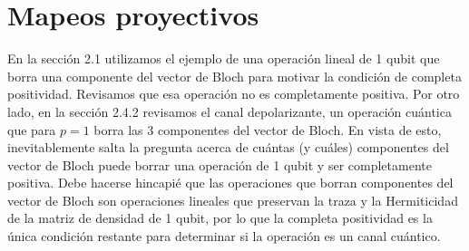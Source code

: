 \chapter{Mapeos proyectivos}  
% 

En la sección 2.1 utilizamos el
ejemplo de una operación lineal 
de 1 qubit que borra una componente del vector de Bloch para motivar
la condición de completa positividad. 
Revisamos que esa operación no es completamente positiva.
Por otro lado, en la sección 2.4.2 revisamos el 
canal depolarizante, un operación cuántica que para $p=1$
borra las 3 componentes del vector de Bloch. En vista de esto, 
inevitablemente salta la pregunta acerca de cuántas (y cuáles) 
componentes del vector de Bloch puede borrar una operación 
de 1 qubit y ser completamente positiva.
Debe hacerse hincapié que las operaciones que borran componentes 
del vector de Bloch son operaciones lineales que 
preservan la traza y la Hermiticidad de la 
matriz de densidad de 1 qubit, por lo que la completa positividad 
es la única condición restante para determinar si la operación 
es un canal cuántico.


